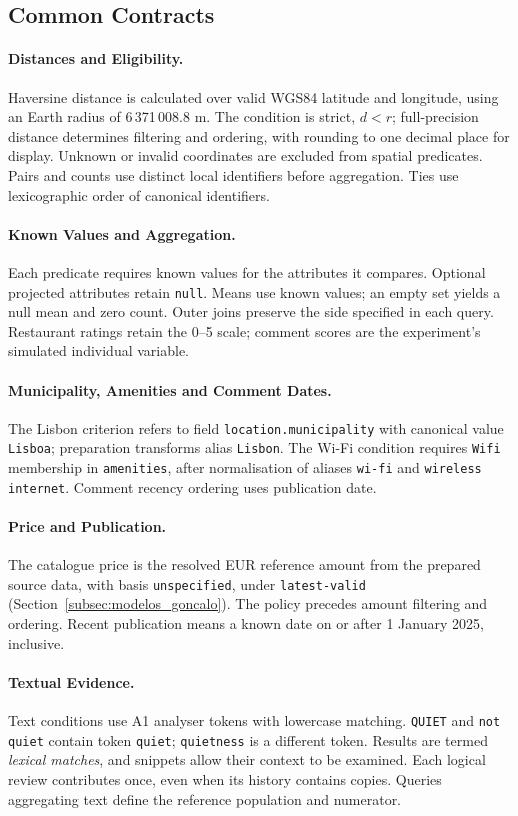 \subsection{Common Contracts}\label{subsec:contratos_consultas}
\paragraph{Distances and Eligibility.}
Haversine distance is calculated over valid WGS84 latitude and longitude, using an Earth radius of 6\,371\,008.8 m. The condition is strict, \(d<r\); full-precision distance determines filtering and ordering, with rounding to one decimal place for display. Unknown or invalid coordinates are excluded from spatial predicates. Pairs and counts use distinct local identifiers before aggregation. Ties use lexicographic order of canonical identifiers.
\paragraph{Known Values and Aggregation.}
Each predicate requires known values for the attributes it compares. Optional projected attributes retain \texttt{null}. Means use known values; an empty set yields a null mean and zero count. Outer joins preserve the side specified in each query. Restaurant ratings retain the 0--5 scale; comment scores are the experiment's simulated individual variable.
\paragraph{Municipality, Amenities and Comment Dates.}
The Lisbon criterion refers to field \texttt{location.municipality} with canonical value \texttt{Lisboa}; preparation transforms alias \texttt{Lisbon}. The Wi-Fi condition requires \texttt{Wifi} membership in \texttt{amenities}, after normalisation of aliases \texttt{wi-fi} and \texttt{wireless internet}. Comment recency ordering uses publication date.
\paragraph{Price and Publication.}
The catalogue price is the resolved EUR reference amount from the prepared source data, with basis \texttt{unspecified}, under \texttt{latest-valid} (Section~\ref{subsec:modelos_goncalo}). The policy precedes amount filtering and ordering. Recent publication means a known date on or after 1 January 2025, inclusive.
\paragraph{Textual Evidence.}
Text conditions use A1 analyser tokens with lowercase matching. \texttt{QUIET} and \texttt{not quiet} contain token \texttt{quiet}; \texttt{quietness} is a different token. Results are termed \emph{lexical matches}, and snippets allow their context to be examined. Each logical review contributes once, even when its history contains copies. Queries aggregating text define the reference population and numerator.
